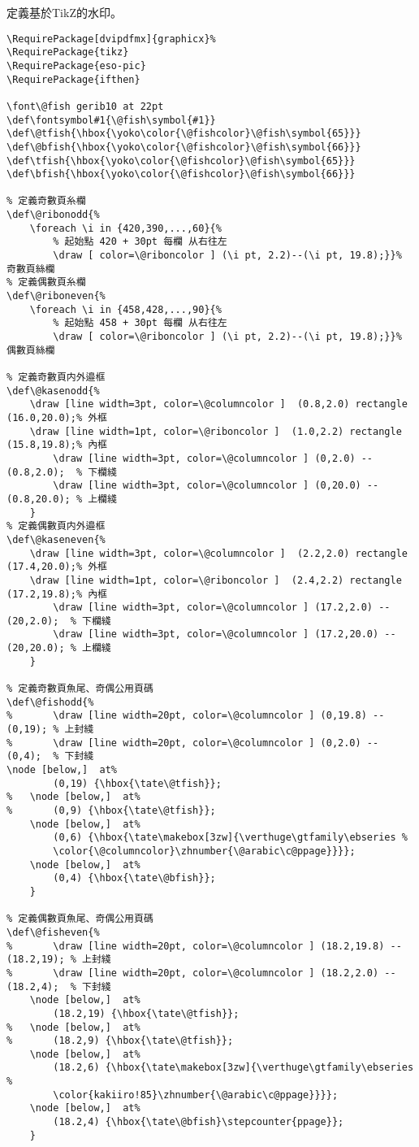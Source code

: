 \par 定義基於TikZ的水印。
\begin{lstlisting}[firstnumber=428]
%%%%%%	自定義的水印命令 %頁眉、頁碼設置
\RequirePackage[dvipdfmx]{graphicx}%
\RequirePackage{tikz}
\RequirePackage{eso-pic}
\RequirePackage{ifthen}

\font\@fish gerib10 at 22pt
\def\fontsymbol#1{\@fish\symbol{#1}}
\def\@tfish{\hbox{\yoko\color{\@fishcolor}\@fish\symbol{65}}}
\def\@bfish{\hbox{\yoko\color{\@fishcolor}\@fish\symbol{66}}}
\def\tfish{\hbox{\yoko\color{\@fishcolor}\@fish\symbol{65}}}
\def\bfish{\hbox{\yoko\color{\@fishcolor}\@fish\symbol{66}}}

% 定義奇數頁糸欄
\def\@ribonodd{%
	\foreach \i in {420,390,...,60}{%
		% 起始點 420 + 30pt 每欄 从右往左
		\draw [ color=\@riboncolor ] (\i pt, 2.2)--(\i pt, 19.8);}}% 奇數頁絲欄 
% 定義偶數頁糸欄
\def\@riboneven{%
	\foreach \i in {458,428,...,90}{% 
		% 起始點 458 + 30pt 每欄 从右往左
		\draw [ color=\@riboncolor ] (\i pt, 2.2)--(\i pt, 19.8);}}% 偶數頁絲欄 

% 定義奇數頁内外邉框
\def\@kasenodd{%
	\draw [line width=3pt, color=\@columncolor ]  (0.8,2.0) rectangle (16.0,20.0);% 外框 
	\draw [line width=1pt, color=\@riboncolor ]  (1.0,2.2) rectangle (15.8,19.8);% 內框 
		\draw [line width=3pt, color=\@columncolor ] (0,2.0) -- (0.8,2.0);  % 下欄綫
		\draw [line width=3pt, color=\@columncolor ] (0,20.0) -- (0.8,20.0); % 上欄綫
	}
% 定義偶數頁内外邉框
\def\@kaseneven{%
	\draw [line width=3pt, color=\@columncolor ]  (2.2,2.0) rectangle (17.4,20.0);% 外框 
	\draw [line width=1pt, color=\@riboncolor ]  (2.4,2.2) rectangle (17.2,19.8);% 內框 
		\draw [line width=3pt, color=\@columncolor ] (17.2,2.0) -- (20,2.0);  % 下欄綫
		\draw [line width=3pt, color=\@columncolor ] (17.2,20.0) -- (20,20.0); % 上欄綫
	}

% 定義奇數頁魚尾、奇偶公用頁碼
\def\@fishodd{%
%		\draw [line width=20pt, color=\@columncolor ] (0,19.8) -- (0,19); % 上封綫
%		\draw [line width=20pt, color=\@columncolor ] (0,2.0) -- (0,4);  % 下封綫
\node [below,]  at%
		(0,19) {\hbox{\tate\@tfish}};
%	\node [below,]  at%
%		(0,9) {\hbox{\tate\@tfish}};
	\node [below,]  at%
		(0,6) {\hbox{\tate\makebox[3zw]{\verthuge\gtfamily\ebseries %
		\color{\@columncolor}\zhnumber{\@arabic\c@ppage}}}};
	\node [below,]  at%
		(0,4) {\hbox{\tate\@bfish}};
	}

% 定義偶數頁魚尾、奇偶公用頁碼
\def\@fisheven{%
%		\draw [line width=20pt, color=\@columncolor ] (18.2,19.8) -- (18.2,19); % 上封綫
%		\draw [line width=20pt, color=\@columncolor ] (18.2,2.0) -- (18.2,4);  % 下封綫
	\node [below,]  at%
		(18.2,19) {\hbox{\tate\@tfish}};
%	\node [below,]  at%
%		(18.2,9) {\hbox{\tate\@tfish}};
	\node [below,]  at%
		(18.2,6) {\hbox{\tate\makebox[3zw]{\verthuge\gtfamily\ebseries %
		\color{kakiiro!85}\zhnumber{\@arabic\c@ppage}}}};
	\node [below,]  at%
		(18.2,4) {\hbox{\tate\@bfish}\stepcounter{ppage}};
	}


\end{lstlisting}
